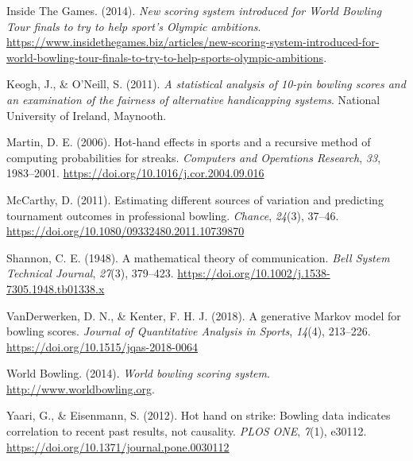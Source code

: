 \documentclass[
  letterpaper,
  DIV=11,
  numbers=noendperiod]{scrartcl}
\newlength{\cslhangindent}
\newenvironment{CSLReferences}[2] %
 {\begin{list}{}{%
  \setlength{\itemindent}{0pt}
  \setlength{\leftmargin}{0pt}
  \setlength{\parsep}{0pt}
  \ifodd #1
   \setlength{\leftmargin}{\cslhangindent}
   \setlength{\itemindent}{-1\cslhangindent}
  \fi
  \setlength{\itemsep}{#2\baselineskip}}}
 {\end{list}}
\begin{document}
\begin{CSLReferences}{1}{0}
Inside The Games. (2014). \emph{New scoring system introduced for {World
Bowling Tour} finals to try to help sport's {Olympic} ambitions}.
\url{https://www.insidethegames.biz/articles/new-scoring-system-introduced-for-world-bowling-tour-finals-to-try-to-help-sports-olympic-ambitions}.

Keogh, J., \& O'Neill, S. (2011). \emph{A statistical analysis of 10-pin
bowling scores and an examination of the fairness of alternative
handicapping systems}. National University of Ireland, Maynooth.

Martin, D. E. (2006). Hot-hand effects in sports and a recursive method
of computing probabilities for streaks. \emph{Computers and Operations
Research}, \emph{33}, 1983--2001.
\url{https://doi.org/10.1016/j.cor.2004.09.016}

McCarthy, D. (2011). Estimating different sources of variation and
predicting tournament outcomes in professional bowling. \emph{Chance},
\emph{24}(3), 37--46.
\url{https://doi.org/10.1080/09332480.2011.10739870}

Shannon, C. E. (1948). A mathematical theory of communication.
\emph{Bell System Technical Journal}, \emph{27}(3), 379--423.
\url{https://doi.org/10.1002/j.1538-7305.1948.tb01338.x}

VanDerwerken, D. N., \& Kenter, F. H. J. (2018). A generative {Markov}
model for bowling scores. \emph{Journal of Quantitative Analysis in
Sports}, \emph{14}(4), 213--226.
\url{https://doi.org/10.1515/jqas-2018-0064}

World Bowling. (2014). \emph{World bowling scoring system}.
\url{http://www.worldbowling.org}.

Yaari, G., \& Eisenmann, S. (2012). Hot hand on strike: Bowling data
indicates correlation to recent past results, not causality. \emph{PLOS
ONE}, \emph{7}(1), e30112.
\url{https://doi.org/10.1371/journal.pone.0030112}

\end{CSLReferences}
\end{document}

